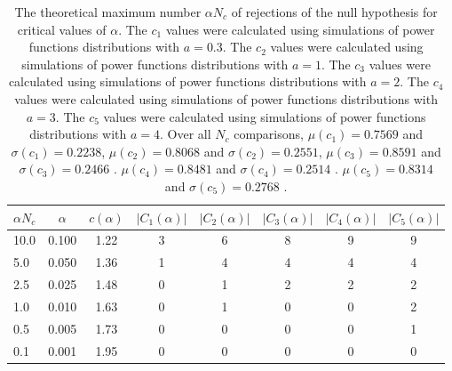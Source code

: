 \begin{table}[h!]
\begin{center}
\begin{tabular}{| l | c | c | c | c | c | c | c |}\hline
$\alpha N_c$ & $\alpha$ & $c(\alpha)$ & $|C_1(\alpha)|$ & $|C_2(\alpha)|$ & $|C_3(\alpha)|$ & $|C_4(\alpha)|$ & $|C_5(\alpha)|$ \\\hline\hline
10.0 & 0.100 & 1.22 & 3 & 6 & 8 & 9 & 9 \\\hline
5.0 & 0.050 & 1.36 & 1 & 4 & 4 & 4 & 4 \\\hline
2.5 & 0.025 & 1.48 & 0 & 1 & 2 & 2 & 2 \\\hline
1.0 & 0.010 & 1.63 & 0 & 1 & 0 & 0 & 2 \\\hline
0.5 & 0.005 & 1.73 & 0 & 0 & 0 & 0 & 1 \\\hline
0.1 & 0.001 & 1.95 & 0 & 0 & 0 & 0 & 0 \\\hline
\end{tabular}
\caption{The theoretical maximum number $\alpha N_c$ of rejections
        of the null hypothesis for critical values of $\alpha$.
        The $c_1$ values were calculated using simulations of power functions distributions with $a=0.3$.
        The $c_2$ values were calculated using simulations of power functions distributions with $a=1$.
        The $c_3$ values were calculated using simulations of power functions distributions with $a=2$.
        The $c_4$ values were calculated using simulations of power functions distributions with $a=3$.
        The $c_5$ values were calculated using simulations of power functions distributions with $a=4$.
        Over all $N_c$ comparisons,
         $\mu(c_1)=0.7569$ and $\sigma(c_1)=0.2238$,
         $\mu(c_2)=0.8068$ and $\sigma(c_2)=0.2551$,
         $\mu(c_3)=0.8591$ and $\sigma(c_3)=0.2466$ .
         $\mu(c_4)=0.8481$ and $\sigma(c_4)=0.2514$ .
         $\mu(c_5)=0.8314$ and $\sigma(c_5)=0.2768$ .
        }
\end{center}
\end{table}
